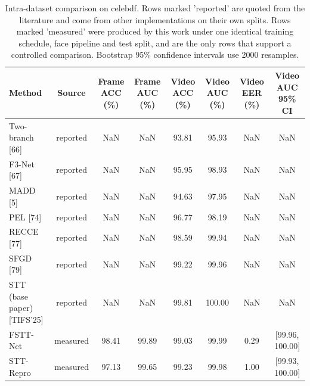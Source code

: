 \begin{table}[!t]
\centering
\caption{Intra-dataset comparison on celebdf. Rows marked 'reported' are quoted from the literature and come from other implementations on their own splits. Rows marked 'measured' were produced by this work under one identical training schedule, face pipeline and test split, and are the only rows that support a controlled comparison. Bootstrap 95\% confidence intervals use 2000 resamples.}
\label{tab:tableII_intra_celebdf}
\footnotesize
\begin{tabular}{lccccccc}
\hline\hline
Method & Source & Frame ACC (\%) & Frame AUC (\%) & Video ACC (\%) & Video AUC (\%) & Video EER (\%) & Video AUC 95\% CI \\
\hline
Two-branch [66] & reported & NaN & NaN & 93.81 & 95.93 & NaN & NaN \\
F3-Net [67] & reported & NaN & NaN & 95.95 & 98.93 & NaN & NaN \\
MADD [5] & reported & NaN & NaN & 94.63 & 97.95 & NaN & NaN \\
PEL [74] & reported & NaN & NaN & 96.77 & 98.19 & NaN & NaN \\
RECCE [77] & reported & NaN & NaN & 98.59 & 99.94 & NaN & NaN \\
SFGD [79] & reported & NaN & NaN & 99.22 & 99.96 & NaN & NaN \\
STT (base paper) [TIFS'25] & reported & NaN & NaN & 99.81 & 100.00 & NaN & NaN \\
FSTT-Net & measured & 98.41 & 99.89 & 99.03 & 99.99 & 0.29 & [99.96, 100.00] \\
STT-Repro & measured & 97.13 & 99.65 & 99.23 & 99.98 & 1.00 & [99.93, 100.00] \\
\hline\hline
\end{tabular}
\end{table}
